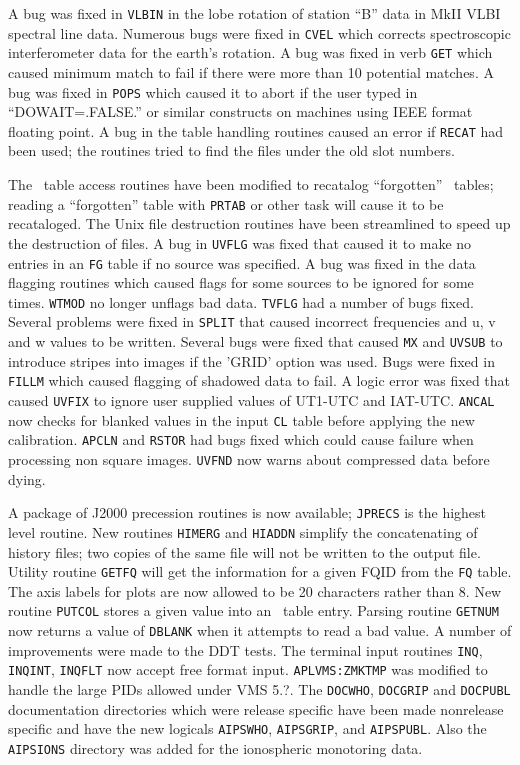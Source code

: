 \vfil\eject
A bug was fixed in {\tt VLBIN} in the lobe rotation of station ``B'' data in
MkII VLBI spectral line data.
Numerous bugs were fixed in {\tt CVEL} which corrects spectroscopic
interferometer data for the earth's rotation.
A bug was fixed in verb {\tt GET} which caused minimum match to fail if
there were more than 10 potential matches.
A bug was fixed in {\tt POPS} which caused it to abort if the user typed in
``DOWAIT=.FALSE.'' or similar constructs on machines using IEEE format
floating point.   A bug in the table
handling routines caused an error if {\tt RECAT} had been used; the routines
tried to find the files under the old slot numbers.

The \AIPS\ table access routines have been modified to recatalog
``forgotten'' \AIPS\ tables; reading a ``forgotten'' table with {\tt PRTAB}
or other task will cause it to be recataloged.
The Unix file destruction routines have been streamlined to speed up
the destruction of files.
A bug in {\tt UVFLG} was fixed that caused it to make no entries in an
{\tt FG} table if no source was specified.  A bug was fixed in the data
flagging routines which caused flags for some sources to be ignored
for some times.  {\tt WTMOD} no longer unflags bad data.  {\tt TVFLG}
had a number of bugs fixed.
Several problems were fixed in {\tt SPLIT} that caused incorrect
frequencies and u, v and w values to be written.  Several bugs were fixed
that caused {\tt MX} and {\tt UVSUB} to introduce stripes into images
if the 'GRID' option was used.  Bugs were fixed in {\tt FILLM} which
caused flagging of shadowed data to fail.
A logic error was fixed that caused {\tt UVFIX} to ignore user supplied
values of UT1-UTC and IAT-UTC.  {\tt ANCAL} now checks for blanked
values in the input {\tt CL} table before applying the new calibration.
{\tt APCLN} and {\tt RSTOR} had bugs fixed which could cause failure
when processing non square images.  {\tt UVFND} now warns about
compressed data before dying.




A package of J2000 precession routines is now available; {\tt JPRECS}
is the highest level routine.
New routines {\tt HIMERG} and {\tt HIADDN} simplify the concatenating
of history files; two copies of the same file will not be written to
the output file.
Utility routine {\tt GETFQ} will get the information for a given FQID from
the {\tt FQ} table.
The axis labels for plots are now allowed to be 20 characters rather
than 8.
New routine {\tt PUTCOL} stores a given value into an \AIPS\ table entry.
Parsing routine {\tt GETNUM} now returns a value of {\tt DBLANK} when
it attempts to read a bad value.
A number of improvements were made to the DDT tests.
The terminal input routines {\tt INQ}, {\tt INQINT}, {\tt INQFLT} now
accept free format input.  {\tt APLVMS:ZMKTMP} was modified to handle
the large PIDs allowed under VMS 5.?.  The {\tt DOCWHO}, {\tt DOCGRIP}
and {\tt DOCPUBL} documentation directories which were  release
specific have been made nonrelease specific and have the new logicals
{\tt AIPSWHO}, {\tt AIPSGRIP}, and {\tt AIPSPUBL}.
Also the {\tt AIPSIONS}  directory was added for the ionospheric
monotoring data.

